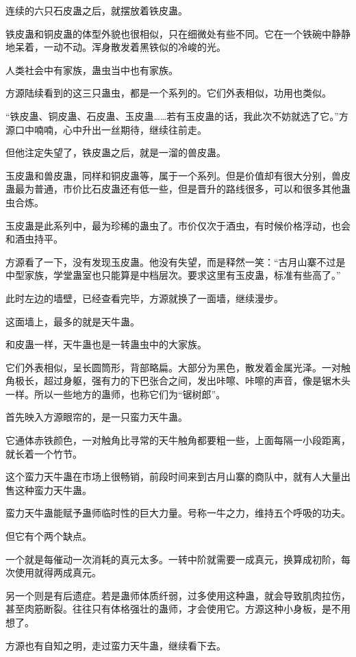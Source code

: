 \begin{this_body}
连续的六只石皮蛊之后，就摆放着铁皮蛊。

铁皮蛊和铜皮蛊的体型外貌也很相似，只在细微处有些不同。它在一个铁碗中静静地呆着，一动不动。浑身散发着黑铁似的冷峻的光。

人类社会中有家族，蛊虫当中也有家族。

方源陆续看到的这三只蛊虫，都是一个系列的。它们外表相似，功用也类似。

“铁皮蛊、铜皮蛊、石皮蛊、玉皮蛊……若有玉皮蛊的话，我此次不妨就选了它。”方源口中喃喃，心中升出一丝期待，继续往前走。

但他注定失望了，铁皮蛊之后，就是一溜的兽皮蛊。

玉皮蛊和兽皮蛊，同样和铜皮蛊等，属于一个系列。但是价值却有很大分别，兽皮蛊最为普通，市价比石皮蛊还有低一些，但是晋升的路线很多，可以和很多其他蛊虫合炼。

玉皮蛊是此系列中，最为珍稀的蛊虫了。市价仅次于酒虫，有时候价格浮动，也会和酒虫持平。

方源看了一下，没有发现玉皮蛊。他没有失望，而是释然一笑：“古月山寨不过是中型家族，学堂蛊室也只能算是中档层次。要求这里有玉皮蛊，标准有些高了。”

此时左边的墙壁，已经查看完毕，方源就换了一面墙，继续漫步。

这面墙上，最多的就是天牛蛊。

和皮蛊一样，天牛蛊也是一转蛊虫中的大家族。

它们外表相似，呈长圆筒形，背部略扁。大部分为黑色，散发着金属光泽。一对触角极长，超过身躯，强有力的下巴张合之间，发出咔嚓、咔嚓的声音，像是锯木头一样。所以一些地方的蛊师，也称它们为“锯树郎”。

首先映入方源眼帘的，是一只蛮力天牛蛊。

它通体赤铁颜色，一对触角比寻常的天牛触角都要粗一些，上面每隔一小段距离，就长着一个竹节。

这个蛮力天牛蛊在市场上很畅销，前段时间来到古月山寨的商队中，就有人大量出售这种蛮力天牛蛊。

蛮力天牛蛊能赋予蛊师临时性的巨大力量。号称一牛之力，维持五个呼吸的功夫。

但它有个两个缺点。

一个就是每催动一次消耗的真元太多。一转中阶就需要一成真元，换算成初阶，每次使用就得两成真元。

另一个则是有后遗症。若是蛊师体质纤弱，过多使用这种蛊，就会导致肌肉拉伤，甚至肉筋断裂。往往只有体格强壮的蛊师，才会使用它。方源这种小身板，是不用想了。

方源也有自知之明，走过蛮力天牛蛊，继续看下去。


\end{this_body}
